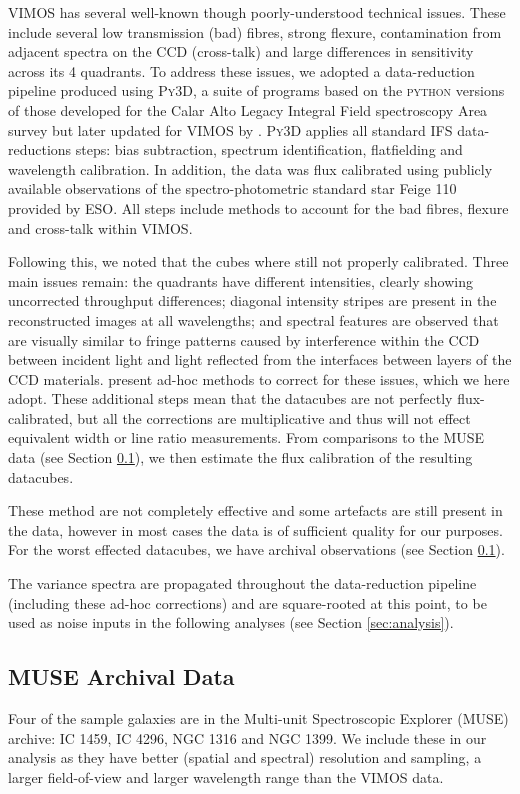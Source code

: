 \documentclass[a4paper,fleqn,usenatbib]{mnras}
\begin{document}
	VIMOS has several well-known though poorly-understood technical issues. These include several low transmission (bad) fibres, strong flexure, contamination from adjacent spectra on the CCD (cross-talk) and large differences in sensitivity across its 4 quadrants. To address these issues, we adopted a data-reduction pipeline produced using \textsc{Py3D}, a suite of programs based on the \textsc{python} versions of those developed for the Calar Alto Legacy Integral Field spectroscopy Area survey \citep[CALIFA;][]{Sanchez2012, Husemann2013} but later updated for VIMOS by \citet{Husemann2014}. \textsc{Py3D} applies all standard IFS data-reductions steps: bias subtraction, spectrum identification, flatfielding and wavelength calibration. In addition, the data was flux calibrated using publicly available observations of the spectro-photometric standard star Feige 110 provided by ESO. All steps include methods to account for the bad fibres, flexure and cross-talk within VIMOS. 

	Following this, we noted that the cubes where still not properly calibrated. Three main issues remain: the quadrants have different intensities, clearly showing uncorrected throughput differences; diagonal intensity stripes are present in the reconstructed images at all wavelengths; and spectral features are observed \citep{Jullo2008} that are visually similar to fringe patterns caused by interference within the CCD between incident light and light reflected from the interfaces between layers of the CCD materials. \citet{Lagerholm2012} present ad-hoc methods to correct for these issues, which we here adopt. These additional steps mean that the datacubes are not perfectly flux-calibrated, but all the corrections are multiplicative and thus will not effect equivalent width or line ratio measurements. From comparisons to the MUSE data (see Section \ref{subsec:MUSE}), we then estimate the flux calibration of the resulting datacubes. 

	These method are not completely effective and some artefacts are still present in the data, however in most cases the data is of sufficient quality for our purposes. For the worst effected datacubes, we have archival observations (see Section \ref{subsec:MUSE}).

	The variance spectra are propagated throughout the data-reduction pipeline (including these ad-hoc corrections) and are square-rooted at this point, to be used as noise inputs in the following analyses (see Section \ref{sec:analysis}).


	\subsection{MUSE Archival Data}
		\label{subsec:MUSE}
		Four of the sample galaxies are in the Multi-unit Spectroscopic Explorer (MUSE) archive: IC 1459, IC 4296, NGC 1316 and NGC 1399. We include these in our analysis as they have better (spatial and spectral) resolution and sampling, a larger field-of-view and larger wavelength range than the VIMOS data. 
\end{document}
